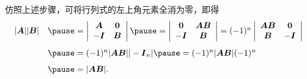 \begin{frame}
  \begin{footnotesize}
    仿照上述步骤，可将行列式的左上角元素全消为零，即得
    $$
    \begin{array}{rl}
      |\A||\B| & \pause = \left|
                 \begin{array}{cc}
                   \A & \zero\\
                   -\II & \B
                 \end{array}
                          \right| \pause = \left|
                          \begin{array}{cc}
                            \zero & \A\B \\
                            -\II & \B
                          \end{array}
                                   \right| = (-1)^n\left|
                                   \begin{array}{cc}
                                     \A\B & \zero\\
                                     \B   & -\II
                                   \end{array}
                                            \right| \\[0.2in]
               & \pause = (-1)^n |\A\B||-\II_n| \pause = (-1)^n |\A\B|(-1)^n \\[0.1in]
               & \pause = |\A\B|.  
    \end{array}
    $$
  \end{footnotesize}
\end{frame}

